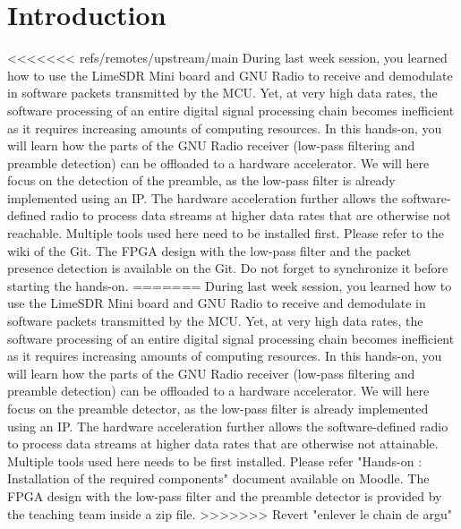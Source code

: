 \section*{Introduction}

<<<<<<< refs/remotes/upstream/main
During last week session, you learned how to use the LimeSDR Mini board and GNU Radio to receive and demodulate in software packets transmitted by the MCU. Yet, at very high data rates, the software processing of an entire digital signal processing chain becomes inefficient as it requires increasing amounts of computing resources. In this hands-on, you will learn how the parts of the GNU Radio receiver (low-pass filtering and preamble detection) can be offloaded to a hardware accelerator. We will here focus on the detection of the preamble, as the low-pass filter is already implemented using an IP. The hardware acceleration further allows the software-defined radio to process data streams at higher data rates that are otherwise not reachable. Multiple tools used here need to be installed first. Please refer to the wiki of the Git. The FPGA design with the low-pass filter and the packet presence detection is available on the Git. Do not forget to synchronize it before starting the hands-on.
=======
During last week session, you learned how to use the LimeSDR Mini board and GNU Radio to receive and demodulate in software packets transmitted by the MCU. Yet, at very high data rates, the software processing of an entire digital signal processing chain becomes inefficient as it requires increasing amounts of computing resources. In this hands-on, you will learn how the parts of the GNU Radio receiver (low-pass filtering and preamble detection) can be offloaded to a hardware accelerator. We will here focus on the preamble detector, as the low-pass filter is already implemented using an IP. The hardware acceleration further allows the software-defined radio to process data streams at higher data rates that are otherwise not attainable. Multiple tools used here needs to be first installed. Please refer "Hands-on \handsOnN: Installation of the required components" document available on Moodle. The FPGA design with the low-pass filter and the preamble detector is provided by the teaching team inside a zip file.
>>>>>>> Revert "enlever le chain de argu"
